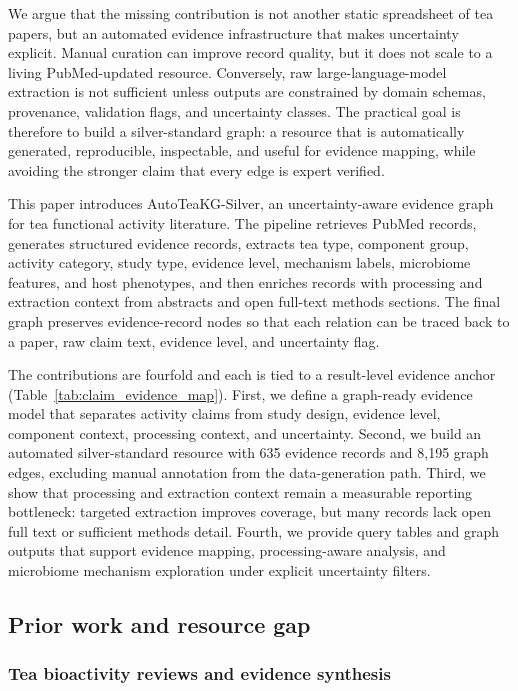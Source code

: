 \documentclass[11pt]{article}
\begin{document}
We argue that the missing contribution is not another static spreadsheet of tea papers, but an automated evidence infrastructure that makes uncertainty explicit. Manual curation can improve record quality, but it does not scale to a living PubMed-updated resource. Conversely, raw large-language-model extraction is not sufficient unless outputs are constrained by domain schemas, provenance, validation flags, and uncertainty classes. The practical goal is therefore to build a silver-standard graph: a resource that is automatically generated, reproducible, inspectable, and useful for evidence mapping, while avoiding the stronger claim that every edge is expert verified.

This paper introduces AutoTeaKG-Silver, an uncertainty-aware evidence graph for tea functional activity literature. The pipeline retrieves PubMed records, generates structured evidence records, extracts tea type, component group, activity category, study type, evidence level, mechanism labels, microbiome features, and host phenotypes, and then enriches records with processing and extraction context from abstracts and open full-text methods sections. The final graph preserves evidence-record nodes so that each relation can be traced back to a paper, raw claim text, evidence level, and uncertainty flag.

The contributions are fourfold and each is tied to a result-level evidence anchor (Table~\ref{tab:claim_evidence_map}). First, we define a graph-ready evidence model that separates activity claims from study design, evidence level, component context, processing context, and uncertainty. Second, we build an automated silver-standard resource with 635 evidence records and 8,195 graph edges, excluding manual annotation from the data-generation path. Third, we show that processing and extraction context remain a measurable reporting bottleneck: targeted extraction improves coverage, but many records lack open full text or sufficient methods detail. Fourth, we provide query tables and graph outputs that support evidence mapping, processing-aware analysis, and microbiome mechanism exploration under explicit uncertainty filters.



\subsection{Prior work and resource gap}

\subsubsection{Tea bioactivity reviews and evidence synthesis}
\end{document}
